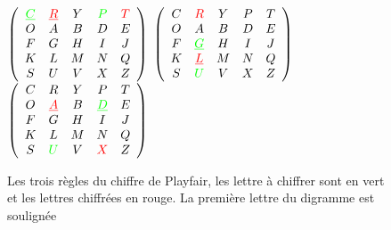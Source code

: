 \begin{figure}[h]
  $
  \left(
    \begin{array}{ccccc}
      \textcolor{green}{\underline{C}} & \textcolor{red}{\underline{R}} & Y & \textcolor{green}{P} & \textcolor{red}{T} \\
      O & A & B & D & E \\
      F & G & H & I & J \\
      K & L & M & N & Q \\
      S & U & V & X & Z
    \end{array}
  \right)
  $
  \hfill
  $
  \left(
    \begin{array}{ccccc}
      C & \textcolor{red}{R} & Y & P & T \\
      O & A & B & D & E \\
      F & \textcolor{green}{\underline{G}} & H & I & J \\
      K & \textcolor{red}{\underline{L}} & M & N & Q \\
      S & \textcolor{green}{U} & V & X & Z
    \end{array}
  \right)
  $
  \hfill
  $
  \left(
    \begin{array}{ccccc}
      C & R & Y & P & T \\
      O & \textcolor{red}{\underline{A}} & B & \textcolor{green}{\underline{D}} & E \\
      F & G & H & I & J \\
      K & L & M & N & Q \\
      S & \textcolor{green}{U} & V & \textcolor{red}{X} & Z
    \end{array}
  \right)
  $
  \caption{Les trois règles du chiffre de Playfair, les lettre à
    chiffrer sont en vert et les lettres chiffrées en rouge. La
    première lettre du digramme est soulignée}
  \label{fig:Playfair}
\end{figure}

